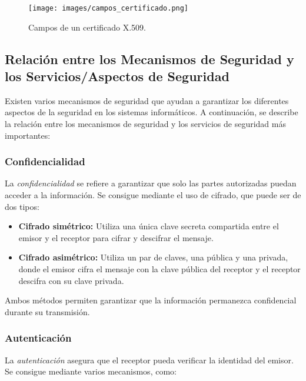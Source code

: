 \documentclass[a4paper,12pt]{article}
\begin{document}
\begin{figure}[H]
    \centering
    \texttt{[image: images/campos\_certificado.png]}
    \caption{Campos de un certificado X.509.}
\end{figure}


\subsection{Relación entre los Mecanismos de Seguridad y los Servicios/Aspectos de Seguridad}

Existen varios mecanismos de seguridad que ayudan a garantizar los diferentes aspectos de la seguridad en los sistemas informáticos. A continuación, se describe la relación entre los mecanismos de seguridad y los servicios de seguridad más importantes:

\subsubsection{Confidencialidad}

La \textit{confidencialidad} se refiere a garantizar que solo las partes autorizadas puedan acceder a la información. Se consigue mediante el uso de cifrado, que puede ser de dos tipos:

\begin{itemize}
    \item \textbf{Cifrado simétrico:} Utiliza una única clave secreta compartida entre el emisor y el receptor para cifrar y descifrar el mensaje.
    \item \textbf{Cifrado asimétrico:} Utiliza un par de claves, una pública y una privada, donde el emisor cifra el mensaje con la clave pública del receptor y el receptor descifra con su clave privada.
\end{itemize}

Ambos métodos permiten garantizar que la información permanezca confidencial durante su transmisión.

\subsubsection{Autenticación}

La \textit{autenticación} asegura que el receptor pueda verificar la identidad del emisor. Se consigue mediante varios mecanismos, como:
\end{document}
